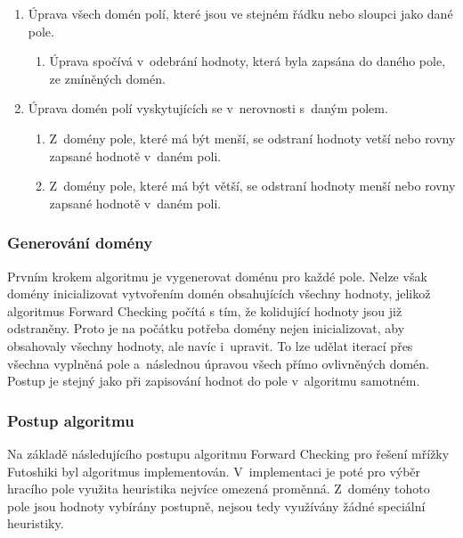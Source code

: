 \begin{enumerate}
    \item Úprava všech domén polí, které jsou ve stejném řádku nebo sloupci
        jako dané pole.
    \begin{enumerate}
        \item Úprava spočívá v~odebrání hodnoty, která byla zapsána do daného
            pole, ze zmíněných domén.
    \end{enumerate}
    \item Úprava domén polí vyskytujících se v~nerovnosti s~daným polem.
    \begin{enumerate}
        \item Z~domény pole, které má být menší, se odstraní hodnoty vetší nebo
            rovny zapsané hodnotě v~daném poli.
        \item Z~domény pole, které má být větší, se odstraní hodnoty menší nebo
            rovny zapsané hodnotě v~daném poli.
    \end{enumerate}
\end{enumerate}

\subsubsection{Generování domény}

Prvním krokem algoritmu je vygenerovat doménu pro každé pole. Nelze však domény
inicializovat vytvořením domén obsahujících všechny hodnoty, jelikož
algoritmus Forward Checking počítá s tím, že kolidující hodnoty jsou již
odstraněny. Proto je na počátku potřeba domény nejen inicializovat, aby
obsahovaly všechny hodnoty, ale navíc i~upravit. To lze udělat iterací přes
všechna vyplněná pole a~následnou úpravou všech přímo ovlivněných domén. Postup
je stejný jako při zapisování hodnot do pole v~algoritmu samotném.


\subsubsection{Postup algoritmu}

Na základě následujícího postupu algoritmu Forward Checking pro řešení mřížky
Futoshiki byl algoritmus implementován. V~implementaci je poté pro výběr
hracího pole využita heuristika nejvíce omezená proměnná. Z~domény tohoto pole
jsou hodnoty vybírány postupně, nejsou tedy využívány žádné speciální
heuristiky.

